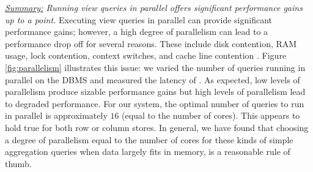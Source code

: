 {\em \underline{Summary:} Running view queries in parallel offers significant
performance gains up to a point.}
Executing view queries in parallel can provide significant performance gains;
however, a high degree of parallelism can lead to a performance drop off for
several reasons. These include disk contention, RAM usage, lock
contention, context switches, and cache line contention \cite{Postgres_wiki}. 
Figure \ref{fig:parallelism} illustrates this issue: we varied the number of
queries running in parallel on the DBMS and measured the latency of
\SeeDB.
As expected, low levels of parallelism produce sizable performance gains but
high levels of parallelism lead to degraded performance.
For our system, the optimal number of queries to run in parallel is
approximately $16$ (equal to the number of cores). 
This appears to hold true for both row or column stores. 
In general, we have found that choosing a degree of parallelism equal to the number of cores
for these kinds of simple aggregation queries when data largely fits in memory,
is a reasonable rule of thumb.  



